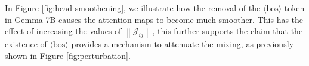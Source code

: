 \documentclass{article} %
\newcommand{\J}{\mathcal{J}}
\newcommand{\bos}{\ensuremath{\langle\text{bos}\rangle}\xspace}
\begin{document}
In Figure \ref{fig:head-smoothening}, we illustrate how the removal of the \bos token in Gemma 7B causes the attention maps to become much smoother. This has the effect of increasing the values of $\left \lVert \J_{ij} \right \rVert$, this further supports the claim that the existence of \bos provides a mechanism to attenuate the mixing, as previously shown in Figure \ref{fig:perturbation}.
 

\begin{figure}[H]
    \centering
     \\
    

\end{figure}
\end{document}

